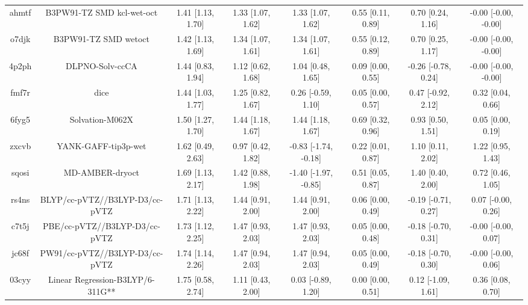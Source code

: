 \documentclass{article}
\begin{document}
\begin{center}
\begin{longtable}{|cccccccc|}
 ahmtf &                          B3PW91-TZ SMD kcl-wet-oct &  1.41 [1.13, 1.70] &  1.33 [1.07, 1.62] &     1.33 [1.07, 1.62] &  0.55 [0.11, 0.89] &    0.70 [0.24, 1.16] &  -0.00 [-0.00, -0.00] \\
 o7djk &                               B3PW91-TZ SMD wetoct &  1.42 [1.13, 1.69] &  1.34 [1.07, 1.61] &     1.34 [1.07, 1.61] &  0.55 [0.12, 0.89] &    0.70 [0.25, 1.17] &  -0.00 [-0.00, -0.00] \\
 4p2ph &                                    DLPNO-Solv-ccCA &  1.44 [0.83, 1.94] &  1.12 [0.62, 1.68] &     1.04 [0.48, 1.65] &  0.09 [0.00, 0.55] &  -0.26 [-0.78, 0.24] &  -0.00 [-0.00, -0.00] \\
 fmf7r &                                               dice &  1.44 [1.03, 1.77] &  1.25 [0.82, 1.67] &    0.26 [-0.59, 1.10] &  0.05 [0.00, 0.57] &   0.47 [-0.92, 2.12] &     0.32 [0.04, 0.66] \\
 6fyg5 &                                    Solvation-M062X &  1.50 [1.27, 1.70] &  1.44 [1.18, 1.67] &     1.44 [1.18, 1.67] &  0.69 [0.32, 0.96] &    0.93 [0.50, 1.51] &     0.05 [0.00, 0.19] \\
 zxcvb &                                YANK-GAFF-tip3p-wet &  1.62 [0.49, 2.63] &  0.97 [0.42, 1.82] &  -0.83 [-1.74, -0.18] &  0.22 [0.01, 0.87] &    1.10 [0.11, 2.02] &     1.22 [0.95, 1.43] \\
 sqosi &                                    MD-AMBER-dryoct &  1.69 [1.13, 2.17] &  1.42 [0.88, 1.98] &  -1.40 [-1.97, -0.85] &  0.51 [0.05, 0.87] &    1.40 [0.40, 2.00] &     0.72 [0.46, 1.05] \\
 rs4ns &                     BLYP/cc-pVTZ//B3LYP-D3/cc-pVTZ &  1.71 [1.13, 2.22] &  1.44 [0.91, 2.00] &     1.44 [0.91, 2.00] &  0.06 [0.00, 0.49] &  -0.19 [-0.71, 0.27] &    0.07 [-0.00, 0.26] \\
 c7t5j &                      PBE/cc-pVTZ//B3LYP-D3/cc-pVTZ &  1.73 [1.12, 2.25] &  1.47 [0.93, 2.03] &     1.47 [0.93, 2.03] &  0.05 [0.00, 0.48] &  -0.18 [-0.70, 0.31] &   -0.00 [-0.00, 0.07] \\
 jc68f &                     PW91/cc-pVTZ//B3LYP-D3/cc-pVTZ &  1.74 [1.14, 2.26] &  1.47 [0.94, 2.03] &     1.47 [0.94, 2.03] &  0.05 [0.00, 0.49] &  -0.18 [-0.70, 0.30] &   -0.00 [-0.00, 0.06] \\
 03cyy &                   Linear Regression-B3LYP/6-311G** &  1.75 [0.58, 2.74] &  1.11 [0.43, 2.00] &    0.03 [-0.89, 1.20] &  0.00 [0.00, 0.51] &   0.12 [-1.09, 1.61] &     0.36 [0.08, 0.70] \\

\end{longtable}
\end{center}
\end{document}
